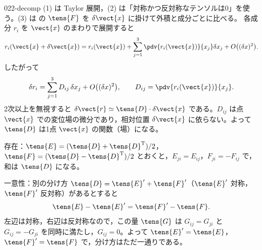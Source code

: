 \documentclass[uplatex,dvipdfmx,a4paper,11pt]{jsarticle}
\begin{document}
\begin{kaisetsu}{022-decomp}
\houshin (1) は Taylor 展開，(2) は「対称かつ反対称なテンソルは0」を使う。(3) は  の $\tens{F}$ を $\delta\vect{x}$ に掛けて外積と成分ごとに比べる。
\keisan {} 各成分 $r_i$ を $\vect{x}$ のまわりで展開すると
\[ r_i(\vect{x}+\delta\vect{x})=r_i(\vect{x})+\sum_{j=1}^{3}\pdv{r_i(\vect{x})}{x_j}\delta x_j+O\bigl((\delta x)^{2}\bigr). \]
したがって
\[ \delta r_i=\sum_{j=1}^{3}D_{ij}\,\delta x_j+O\bigl((\delta x)^{2}\bigr),\qquad D_{ij}=\pdv{r_i(\vect{x})}{x_j}. \]
2次以上を無視すると $\delta\vect{r}\simeq\tens{D}\cdot\delta\vect{x}$ である。$D_{ij}$ は点 $\vect{x}$ での変位場の微分であり，相対位置 $\delta\vect{x}$ に依らない。よって $\tens{D}$ は1点 $\vect{x}$ の関数（場）になる。

 存在：$\tens{E}=(\tens{D}+\tens{D}^{\mathrm{T}})/2$，$\tens{F}=(\tens{D}-\tens{D}^{\mathrm{T}})/2$ とおくと，$E_{ji}=E_{ij}$，$F_{ji}=-F_{ij}$ で，和は $\tens{D}$ になる。

一意性：別の分け方 $\tens{D}=\tens{E}'+\tens{F}'$（$\tens{E}'$ 対称，$\tens{F}'$ 反対称）があるとすると
\[ \tens{E}-\tens{E}'=\tens{F}'-\tens{F}. \]
左辺は対称，右辺は反対称なので，この量 $\tens{G}$ は $G_{ij}=G_{ji}$ と $G_{ij}=-G_{ji}$ を同時に満たし，$G_{ij}=0$。よって $\tens{E}'=\tens{E}$，$\tens{F}'=\tens{F}$ で，分け方はただ一通りである。


\end{kaisetsu}
\end{document}
